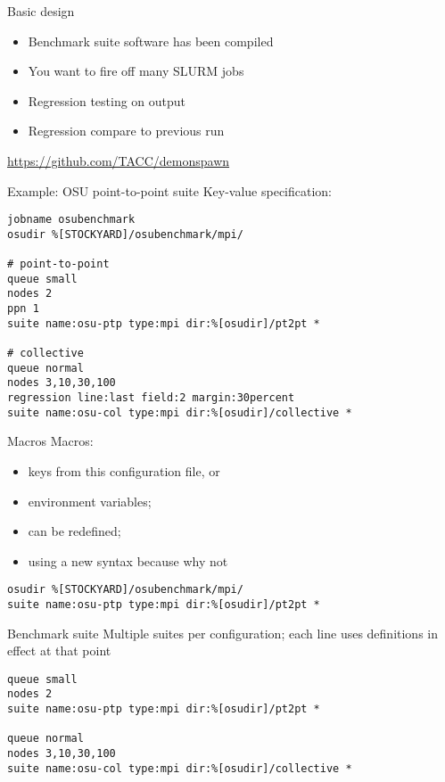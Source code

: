 \begin{numberedframe}{Basic design}
  \begin{itemize}
  \item Benchmark suite software has been compiled
  \item You want to fire off many SLURM jobs
  \item Regression testing on output
  \item Regression compare to previous run
  \end{itemize}
  \url{https://github.com/TACC/demonspawn}
\end{numberedframe}

\begin{numberedframe}{Example: OSU point-to-point suite}
  Key-value specification:
\begin{verbatim}
jobname osubenchmark
osudir %[STOCKYARD]/osubenchmark/mpi/

# point-to-point
queue small
nodes 2
ppn 1
suite name:osu-ptp type:mpi dir:%[osudir]/pt2pt *

# collective
queue normal
nodes 3,10,30,100
regression line:last field:2 margin:30percent
suite name:osu-col type:mpi dir:%[osudir]/collective *
\end{verbatim}
\end{numberedframe}

\begin{numberedframe}{Macros}
  Macros:
  \begin{itemize}
  \item keys from this configuration file, or
  \item environment variables;
  \item can be redefined;
  \item using a new syntax because why not
  \end{itemize}
\begin{verbatim}
osudir %[STOCKYARD]/osubenchmark/mpi/
suite name:osu-ptp type:mpi dir:%[osudir]/pt2pt *
\end{verbatim}
\end{numberedframe}

\begin{numberedframe}{Benchmark suite}
  Multiple suites per configuration;
  each  line uses definitions in effect at that point
\begin{verbatim}
queue small
nodes 2
suite name:osu-ptp type:mpi dir:%[osudir]/pt2pt *

queue normal
nodes 3,10,30,100
suite name:osu-col type:mpi dir:%[osudir]/collective *
\end{verbatim}
\end{numberedframe}

